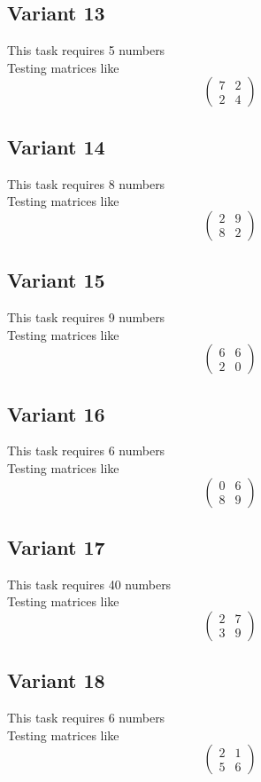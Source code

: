 \documentclass[11pt]{article}
\begin{document}
\subsection*{Variant 13}
This task requires 5 numbers\\
Testing matrices like \[ \begin{pmatrix} 7 & 2\\ 2 & 4 \end{pmatrix} \]

\subsection*{Variant 14}
This task requires 8 numbers\\
Testing matrices like \[ \begin{pmatrix} 2 & 9\\ 8 & 2 \end{pmatrix} \]

\subsection*{Variant 15}
This task requires 9 numbers\\
Testing matrices like \[ \begin{pmatrix} 6 & 6\\ 2 & 0 \end{pmatrix} \]

\subsection*{Variant 16}
This task requires 6 numbers\\
Testing matrices like \[ \begin{pmatrix} 0 & 6\\ 8 & 9 \end{pmatrix} \]

\subsection*{Variant 17}
This task requires 40 numbers\\
Testing matrices like \[ \begin{pmatrix} 2 & 7\\ 3 & 9 \end{pmatrix} \]

\subsection*{Variant 18}
This task requires 6 numbers\\
Testing matrices like \[ \begin{pmatrix} 2 & 1\\ 5 & 6 \end{pmatrix} \]
\end{document}
